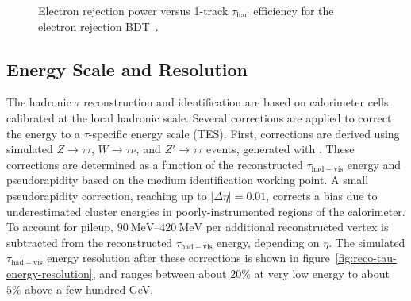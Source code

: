 \begin{figure}
	\centering
	\caption[Electron rejection power versus 1-track $\tau_{\mathrm{had}}$ efficiency for the electron rejection BDT.]{Electron rejection power versus 1-track $\tau_{\mathrm{had}}$ efficiency for the electron rejection BDT~\cite{TheATLASCollaboration:2015be}.}
	\label{fig:reco-tau-electron-rejection-efficiency}
\end{figure}

\subsection{Energy Scale and Resolution}\label{sec:reco-tau-energymomentum}
The hadronic $\tau$ reconstruction and identification are based on calorimeter cells calibrated at the local hadronic scale. Several corrections are applied to correct the energy to a $\tau$-specific energy scale (TES). First, corrections are derived using simulated $Z\rightarrow\tau\tau$, $W\rightarrow\tau\nu$, and $Z'\rightarrow\tau\tau$ events, generated with . These corrections are determined as a function of the reconstructed $\tau_{\mathrm{had-vis}}$ energy and pseudorapidity based on the medium identification working point. A small pseudorapidity correction, reaching up to $|\Delta\eta|=0.01$, corrects a bias due to underestimated cluster energies in poorly-instrumented regions of the calorimeter. To account for pileup, $\SIrange[range-phrase=-]{90}{420}{\mega\electronvolt}$ per additional reconstructed vertex is subtracted from the reconstructed $\tau_{\mathrm{had-vis}}$ energy, depending on $\eta$. The simulated $\tau_{\mathrm{had-vis}}$ energy resolution after these corrections is shown in figure~\ref{fig:reco-tau-energy-resolution}, and ranges between about $20\%$ at very low energy to about $5\%$ above a few hundred GeV.

